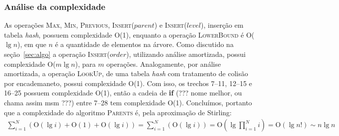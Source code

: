 \subsubsection{Análise da complexidade}
As operações \textsc{Max}, \textsc{Min}, \textsc{Previous},
\textsc{Insert}($parent$) e \textsc{Insert}($level$), inserção em tabela
\textit{hash}, possuem complexidade O(1), enquanto a operação
\textsc{LowerBound} é O($\lg n$), em que $n$ é a quantidade de elementos na árvore. Como discutido na seção~\ref{sec:algo}
a operação \textsc{Insert}($order$), utilizando análise amortizada, possui
complexidade O($m \lg n$), para $m$ operações. Analogamente, por análise amortizada, a operação
\textsc{LookUp}, de uma tabela \textit{hash} com tratamento de colisão por
encademaneto, possui complexidade O(1). Com isso, os trechos 7--11, 12--15 e
16--25 possuem complexidade O(1), então a cadeia de \textbf{if} (??? nome
melhor, ou chama assim msm ???) entre 7--28 tem complexidade O(1). Concluímos,
portanto que a complexidade do algoritmo \textsc{Parents} é, pela aproximação de
Stirling:
\begin{align*}
  \sum_{i = 1}^{N}(\text{O}(\lg i) + \text{O}(1) + \text{O}(\lg i)) = \sum_{i = 1}^{N}(\text{O}(\lg i)) = \text{O}(\lg \prod_{i = 1}^{N} i) = \text{O}(\lg n!) \sim n \lg n
\end{align*}